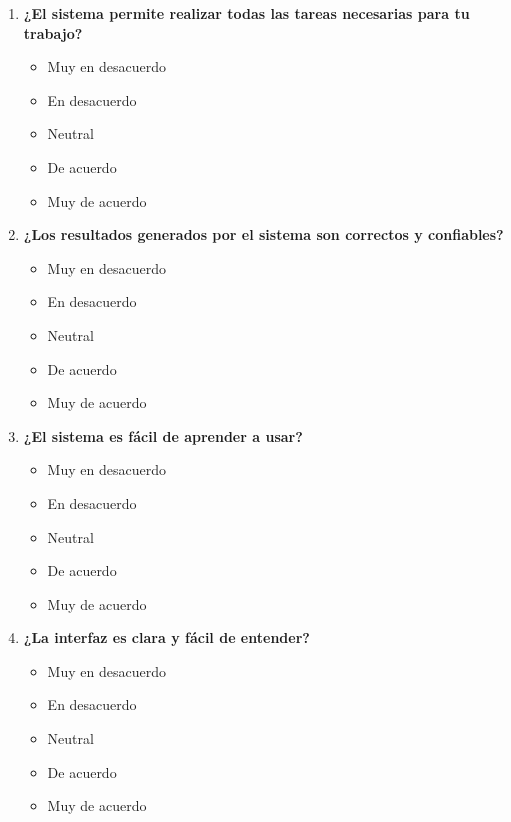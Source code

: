\documentclass[conference]{IEEEtran}
\begin{document}
\begin{enumerate}
    \item \textbf{¿El sistema permite realizar todas las tareas necesarias para tu trabajo?}
        \begin{itemize}
            \item Muy en desacuerdo
            \item En desacuerdo
            \item Neutral
            \item De acuerdo
            \item Muy de acuerdo
        \end{itemize}

    \item \textbf{¿Los resultados generados por el sistema son correctos y confiables?}
        \begin{itemize}
            \item Muy en desacuerdo
            \item En desacuerdo
            \item Neutral
            \item De acuerdo
            \item Muy de acuerdo
        \end{itemize}
        
    \item \textbf{¿El sistema es fácil de aprender a usar?}
        \begin{itemize}
            \item Muy en desacuerdo
            \item En desacuerdo
            \item Neutral
            \item De acuerdo
            \item Muy de acuerdo
        \end{itemize}
        
    \item \textbf{¿La interfaz es clara y fácil de entender?}
        \begin{itemize}
            \item Muy en desacuerdo
            \item En desacuerdo
            \item Neutral
            \item De acuerdo
            \item Muy de acuerdo
        \end{itemize}
        

\end{enumerate}
\end{document}
